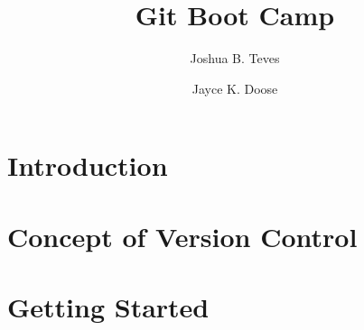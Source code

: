 \documentclass[12pt]{amsbook}
\title{Git Boot Camp}
\author{Joshua B. Teves}
\author{Jayce K. Doose}
\begin{document}
\maketitle

\tableofcontents

\chapter*{Introduction}


\chapter{Concept of Version Control}


\chapter{Getting Started}

\end{document}
